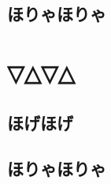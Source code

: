 \documentclass[12pt,dvipdfmx]{jreport}
\begin{document}
\section{ほりゃほりゃ}
\chapter{▽△▽△}
\section{ほげほげ}
\section{ほりゃほりゃ}


\end{document}
